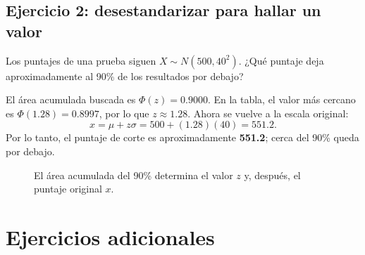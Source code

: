 \documentclass[11pt]{article}
\begin{document}
\clearpage
\subsection*{Ejercicio 2: desestandarizar para hallar un valor}
Los puntajes de una prueba siguen $X\sim N(500,40^2)$. ¿Qué puntaje deja aproximadamente al 90\% de los resultados por debajo?

El área acumulada buscada es $\Phi(z)=0.9000$. En la tabla, el valor más cercano es $\Phi(1.28)=0.8997$, por lo que $z\approx1.28$. Ahora se vuelve a la escala original:
\[
x=\mu+z\sigma=500+(1.28)(40)=551.2.
\]
Por lo tanto, el puntaje de corte es aproximadamente \textbf{551.2}; cerca del 90\% queda por debajo.

\begin{figure}[htbp]
\centering
{}
\caption{El área acumulada del 90\% determina el valor $z$ y, después, el puntaje original $x$.}
\label{fig:desestandarizar}
\end{figure}

\clearpage
\begingroup
\small
\setlength{\parskip}{0.2\baselineskip}
\setlength{\itemsep}{0.1em}
\setlength{\topsep}{0.2em}
\section{Ejercicios adicionales}
\end{document}
